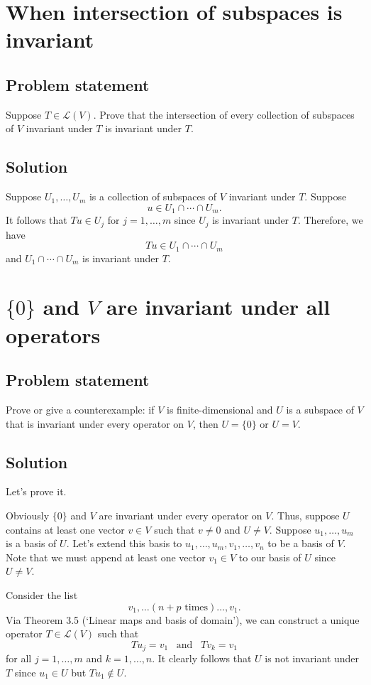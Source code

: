 \documentclass{article}
\begin{document}
\clearpage

\section{When intersection of subspaces is invariant}
\subsection*{Problem statement}
Suppose $T\in\mathcal{L}(V)$. 
Prove that the intersection of every collection of subspaces of $V$ invariant under $T$ is invariant under $T$.

\subsection*{Solution}
Suppose $U_1,\ldots,U_m$ is a collection of subspaces of $V$ invariant under $T$. 
Suppose 
\[u\in U_1\cap\cdots\cap U_m.\]
It follows that $Tu\in U_j$ for $j=1,\ldots,m$ since $U_j$ is invariant under $T$. 
Therefore, we have 
\[Tu\in U_1\cap\cdots\cap U_m\]
and $U_1\cap\cdots\cap U_m$ is invariant under $T$.

\clearpage

\section{$\{0\}$ and $V$ are invariant under all operators}
\subsection*{Problem statement}
Prove or give a counterexample: if $V$ is finite-dimensional and $U$ is a subspace of $V$ that is invariant under every operator on $V$, then $U=\{0\}$ or $U=V$.

\subsection*{Solution}
Let's prove it.

Obviously $\{0\}$ and $V$ are invariant under every operator on $V$. 
Thus, suppose $U$ contains at least one vector $v\in V$ such that $v\neq 0$ and $U\neq V$. 
Suppose $u_1,\ldots,u_m$ is a basis of $U$. 
Let's extend this basis to $u_1,\ldots,u_m,v_1,\ldots,v_n$ to be a basis of $V$. 
Note that we must append at least one vector $v_1\in V$ to our basis of $U$ since $U\neq V$. 

Consider the list 
\[v_1,\ldots(n+p\text{ times})\ldots,v_1.\]
Via Theorem 3.5 (`Linear maps and basis of domain'), we can construct a unique operator $T\in\mathcal{L}(V)$ such that 
\[Tu_j=v_1\;\;\;\text{and}\;\;\;Tv_k=v_1\]
for all $j=1,\ldots,m$ and $k=1,\ldots,n$. 
It clearly follows that $U$ is not invariant under $T$ since $u_1\in U$ but $Tu_1\notin U$. 
\end{document}
